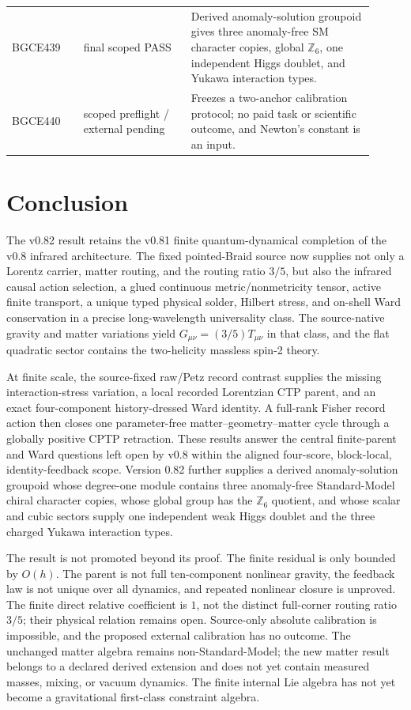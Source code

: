 \documentclass[11pt]{article}
\theoremstyle{definition}
\theoremstyle{remark}
\begin{document}
\begin{longtable}{>{\raggedright\arraybackslash}p{0.18\linewidth} >{\raggedright\arraybackslash}p{0.27\linewidth} >{\raggedright\arraybackslash}p{0.46\linewidth}}
BGCE439 & final scoped PASS & Derived anomaly-solution groupoid gives three anomaly-free SM character copies, global $\mathbb Z_6$, one independent Higgs doublet, and Yukawa interaction types. \\
BGCE440 & scoped preflight / external pending & Freezes a two-anchor calibration protocol; no paid task or scientific outcome, and Newton's constant is an input. \\
\bottomrule
\end{longtable}

\section{Conclusion}

The v0.82 result retains the v0.81 finite quantum-dynamical completion of the v0.8 infrared architecture. The fixed pointed-Braid source now supplies not only a Lorentz carrier, matter routing, and the routing ratio $3/5$, but also the infrared causal action selection, a glued continuous metric/nonmetricity tensor, active finite transport, a unique typed physical solder, Hilbert stress, and on-shell Ward conservation in a precise long-wavelength universality class. The source-native gravity and matter variations yield $G_{\mu\nu}=(3/5)T_{\mu\nu}$ in that class, and the flat quadratic sector contains the two-helicity massless spin-2 theory.

At finite scale, the source-fixed raw/Petz record contrast supplies the missing interaction-stress variation, a local recorded Lorentzian CTP parent, and an exact four-component history-dressed Ward identity. A full-rank Fisher record action then closes one parameter-free matter--geometry--matter cycle through a globally positive CPTP retraction. These results answer the central finite-parent and Ward questions left open by v0.8 within the aligned four-score, block-local, identity-feedback scope. Version 0.82 further supplies a derived anomaly-solution groupoid whose degree-one module contains three anomaly-free Standard-Model chiral character copies, whose global group has the $\mathbb Z_6$ quotient, and whose scalar and cubic sectors supply one independent weak Higgs doublet and the three charged Yukawa interaction types.

The result is not promoted beyond its proof. The finite residual is only bounded by $O(h)$. The parent is not full ten-component nonlinear gravity, the feedback law is not unique over all dynamics, and repeated nonlinear closure is unproved. The finite direct relative coefficient is $1$, not the distinct full-corner routing ratio $3/5$; their physical relation remains open. Source-only absolute calibration is impossible, and the proposed external calibration has no outcome. The unchanged matter algebra remains non-Standard-Model; the new matter result belongs to a declared derived extension and does not yet contain measured masses, mixing, or vacuum dynamics. The finite internal Lie algebra has not yet become a gravitational first-class constraint algebra.
\end{document}
